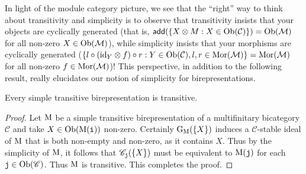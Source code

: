 \noindent In light of the module category picture, we see that the ``right'' way to think about transitivity and simplicity is to observe that transitivity insists that your objects are cyclically generated (that is, $\textsf{add}(\{X \otimes M : X \in \textup{Ob}(\mathcal{C})\}) = \textup{Ob}(\mathcal{M})$ for all non-zero $X \in \textup{Ob}(\mathcal{M})$), while simplicity insists that your morphisms are cyclically generated ($\{l \circ (\textup{id}_Y \otimes f) \circ r : Y \in \textup{Ob}(\mathcal{C}), l, r \in \textup{Mor}(\mathcal{M})\} = \textup{Mor}(\mathcal{M})$ for all non-zero $f \in \textup{Mor}(\mathcal{M})$)! This perspective, in addition to the following result, really elucidates our notion of simplicity for birepresentations.\newpage


\noindent\begin{proposition} Every simple transitive birepresentation is transitive.\\
\end{proposition}

\noindent\begin{proof} %
Let $\textup{M}$ be a simple transitive birepresentation of a multifinitary bicategory $\mathscr{C}$ and take $X \in \textup{Ob}(\textup{M}(\textup{\texttt{i}}))$ non-zero. Certainly $\textup{G}_\textup{M}(\{X\})$ induces a $\mathscr{C}$-stable ideal of $\textup{M}$ that is both non-empty and non-zero, as it contains $X$. Thus by the simplicity of $\textup{M}$, it follows that $\mathscr{C}_{\textup{\texttt{j}}}(\{X\})$ must be equivalent to $\textup{M}(\textup{\texttt{j}})$ for each $\textup{\texttt{j}} \in \textup{Ob}(\mathscr{C})$. Thus $\textup{M}$ is transitive. This completes the proof.
\end{proof}\\

